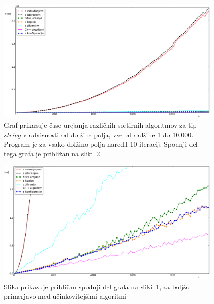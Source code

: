 \documentclass[a4paper,oneside,12pt]{article}
\begin{document}
\begin{figure}[h!]
    \includegraphics[width=\textwidth]{slike/string10000.pdf}
    \vspace{-0.7cm}
    \caption[Rezultati za tip \emph{string}, 10.000 el.]{Graf prikazuje čase
    urejanja različnih sortirnih algoritmov za tip \emph{string} v odvisnosti od dolžine polja, vse
    od dolžine 1 do 10.000. Program je za vsako dolžino polja naredil 10
    iteracij. Spodnji del tega grafa je približan na
    sliki~\ref{fig:rez:string10000zoom}}
    \label{fig:rez:string10000}
\end{figure}

\begin{figure}[h!]
    \includegraphics[width=\textwidth]{slike/string10000zoom.pdf}
    \vspace{-0.7cm}
    \caption[Rezultati za tip \emph{string}, 10.000 el. -- približano]
    {Slika prikazuje približan spodnji del grafa na sliki~\ref{fig:rez:string10000},
    za boljšo primerjavo med učinkovitejšimi algoritmi}
    \label{fig:rez:string10000zoom}
\end{figure}
\pagebreak
\end{document}
